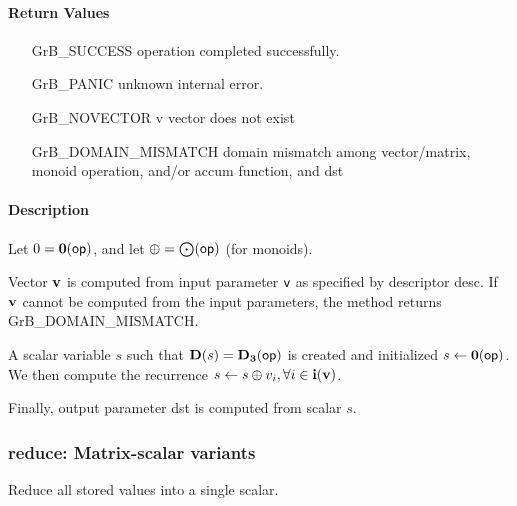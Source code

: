 \paragraph{Return Values}

\begin{itemize}[leftmargin=2.1in]
\item[{\sf GrB\_SUCCESS}]             operation completed successfully.
\item[{\sf GrB\_PANIC}]               unknown internal error.
\item[{\sf GrB\_NOVECTOR}]   {\sf v} vector does not exist
\item[{\sf GrB\_DOMAIN\_MISMATCH}]  
        domain mismatch among vector/matrix, monoid operation, and/or
        accum function, and {\sf dst} 
\end{itemize}

\paragraph{Description}


Let $0 = \bold{0}({\sf op})$, and let $\oplus = \bigodot({\sf op})$ (for monoids).

Vector ${\bf v}$ is computed from input parameter ${\sf v}$ as
specified by descriptor {\sf desc}. If ${\bf v}$ cannot be computed
from the input parameters, the method returns {\sf GrB\_DOMAIN\_MISMATCH}.

A scalar variable $s$ such that $\bold{D}(s) = \bold{D_3}({\sf op})$ is
created and initialized $s \leftarrow \bold{0}({\sf op})$. 
We then compute the recurrence $s \leftarrow s \oplus v_i, \forall i \in {\bf i}({\bf v})$.

Finally, output parameter {\sf dst} is computed from scalar $s$.

\subsubsection{{\sf reduce}: Matrix-scalar variants}

Reduce all stored values into a single scalar.

\paragraph{\syntax}


